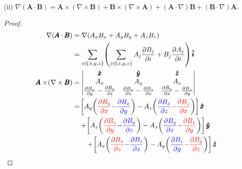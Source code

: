 \documentclass[a4paper]{article}
\begin{document}

(ii) \( \nabla \!\left( \pmb{A} \cdot \pmb{B} \right) = \pmb{A} \times \!\left( \nabla \times \pmb{B} \right) + \pmb{B} \times \!\left( \nabla \times \pmb{A} \right) + \!\left( \pmb{A} \cdot \nabla \right)\pmb{B} + \!\left( \pmb{B} \cdot \nabla \right)\pmb{A} \).

\begin{proof}[Proof]
\begin{align*}
	\nabla \!\left( \pmb{A} \cdot \pmb{B} \right) & = \nabla \!\left( A_{x}B_{x} + A_{y}B_{y} + A_{z}B_{z} \right) \\
	 & = \sum_{i \in \!\left\{ x,y,z \right\}} \!\left( \sum_{j \in \!\left\{ x,y,z \right\}} A_{j}\frac{\partial B_{j}}{\partial i} + B_{j}\frac{\partial A_{j}}{\partial i} \right)\pmb{\hat{i}} \\
	\pmb{A} \times \!\left( \nabla \times \pmb{B} \right) & = \begin{vmatrix}
		\pmb{\hat{x}} & \pmb{\hat{y}} & \pmb{\hat{z}} \\
		A_{x} & A_{y} & A_{z} \\
		\frac{\partial B_{z}}{\partial y} - \frac{\partial B_{y}}{\partial z} & \frac{\partial B_{x}}{\partial z} - \frac{\partial B_{z}}{\partial x} & \frac{\partial B_{y}}{\partial x} - \frac{\partial B_{x}}{\partial y}
	\end{vmatrix} \\
							      & = \!\left[ A_{y}\!\left( \textcolor{red}{\frac{\partial B_{y}}{\partial x}} \textcolor{blue}{- \frac{\partial B_{x}}{\partial y}} \right) - A_{z}\!\left( \textcolor{blue}{\frac{\partial B_{x}}{\partial z}} \textcolor{red}{- \frac{\partial B_{z}}{\partial x}} \right) \right]\pmb{\hat{x}} \\
							      & \quad + \!\left[ A_{z}\!\left( \textcolor{red}{\frac{\partial B_{z}}{\partial y}} \textcolor{blue}{- \frac{\partial B_{y}}{\partial z}} \right) - A_{x}\!\left( \textcolor{blue}{\frac{\partial B_{y}}{\partial x}} \textcolor{red}{- \frac{\partial B_{x}}{\partial y}} \right) \right]\pmb{\hat{y}} \\
							      & \qquad + \!\left[ A_{x}\!\left( \textcolor{red}{\frac{\partial B_{x}}{\partial z}} \textcolor{blue}{- \frac{\partial B_{z}}{\partial x}} \right) - A_{y}\!\left( \textcolor{blue}{\frac{\partial B_{z}}{\partial y}} \textcolor{red}{- \frac{\partial B_{y}}{\partial z}} \right) \right]\pmb{\hat{z}} \\

\end{align*}
\end{proof}
\end{document}
